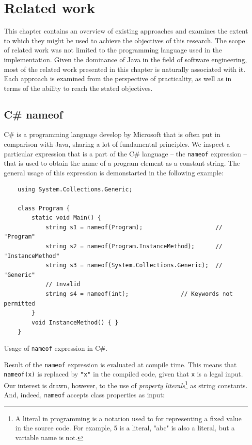 \chapter{Related work}\label{chap:relwork}
This chapter contains an overview of existing approaches and examines the extent to which they might be used to achieve the objectives of this research.
The scope of related work was not limited to the programming language used in the implementation.
Given the dominance of Java in the field of software engineering, most of the related work presented in this chapter is naturally associated with it.
Each approach is examined from the perspective of practicality, as well as in terms of the ability to reach the stated objectives.

\section{C\# nameof}
C\# is a programming language develop by Microsoft that is often put in comparison with Java, sharing a lot of fundamental principles.
We inspect a particular expression that is a part of the C\# language -- the \texttt{nameof} expression \cite{cSharp-nameof} -- that is used to obtain the name of a program element as a constant string.
The general usage of this expression is demonstarted in the following example:

\begin{listing}[H]
    \begin{verbatim}
    using System.Collections.Generic;

    class Program {
        static void Main() {
            string s1 = nameof(Program);                     // "Program"
            string s2 = nameof(Program.InstanceMethod);      // "InstanceMethod"
            string s3 = nameof(System.Collections.Generic);  // "Generic"
            // Invalid
            string s4 = nameof(int);               // Keywords not permitted
        }
        void InstanceMethod() { }
    }
    \end{verbatim}
    \caption{Usage of \texttt{nameof} expression in C\#.}
    \label{lst:csharp-nameof}
\end{listing}

Result of the \texttt{nameof} expression is evaluated at compile time.
This means that \texttt{nameof(x)} is replaced by \texttt{"x"} in the compiled code, given that \texttt{x} is a legal input.
Our interest is drawn, however, to the use of \textit{property literals}\footnote{A literal in programming is a notation used to for representing a fixed value in the source code. For example, 5 is a literal, "abc" is also a literal, but a variable name is not.} as string constants. And, indeed, \texttt{nameof} accepts class properties as input:

